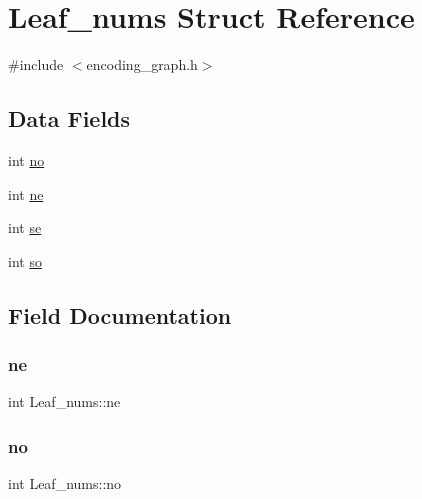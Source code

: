\hypertarget{structLeaf__nums}{}\section{Leaf\+\_\+nums Struct Reference}
\label{structLeaf__nums}


{\ttfamily \#include $<$encoding\+\_\+graph.\+h$>$}

\subsection*{Data Fields}
\begin{DoxyCompactItemize}
\item 
int \hyperlink{structLeaf__nums_a9ed5674a50ffc00ce39d92100ae7ef56}{no}
\item 
int \hyperlink{structLeaf__nums_ae3e6a701d1453d174452c61177ed4852}{ne}
\item 
int \hyperlink{structLeaf__nums_af79e494cdc8b28c367d9ea5b424ddee2}{se}
\item 
int \hyperlink{structLeaf__nums_a32b3e25b99383c612970591174f75885}{so}
\end{DoxyCompactItemize}


\subsection{Field Documentation}
\mbox{\label{structLeaf__nums_ae3e6a701d1453d174452c61177ed4852}} 
\subsubsection{\texorpdfstring{ne}{ne}}
{\footnotesize\ttfamily int Leaf\+\_\+nums\+::ne}

\mbox{\label{structLeaf__nums_a9ed5674a50ffc00ce39d92100ae7ef56}} 
\subsubsection{\texorpdfstring{no}{no}}
{\footnotesize\ttfamily int Leaf\+\_\+nums\+::no}

\mbox{\label{structLeaf__nums_af79e494cdc8b28c367d9ea5b424ddee2}} 
